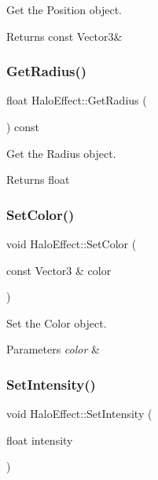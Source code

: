 Get the Position object. 

\begin{DoxyReturn}{Returns}
const Vector3\& 
\end{DoxyReturn}
\mbox{\label{classHaloEffect_a408bdc91b45f3162f05901f46db1bf86}} 
\subsubsection{\texorpdfstring{Get\+Radius()}{GetRadius()}}
{\footnotesize\ttfamily float Halo\+Effect\+::\+Get\+Radius (\begin{DoxyParamCaption}{ }\end{DoxyParamCaption}) const\hspace{0.3cm}{\ttfamily [inline]}}



Get the Radius object. 

\begin{DoxyReturn}{Returns}
float 
\end{DoxyReturn}
\mbox{\label{classHaloEffect_a71a0daca89eeaca58de0ac973b568fa7}} 
\subsubsection{\texorpdfstring{Set\+Color()}{SetColor()}}
{\footnotesize\ttfamily void Halo\+Effect\+::\+Set\+Color (\begin{DoxyParamCaption}\item[{const Vector3 \&}]{color }\end{DoxyParamCaption})}



Set the Color object. 


\begin{DoxyParams}{Parameters}
{\em color} & \\
\hline
\end{DoxyParams}
\mbox{\label{classHaloEffect_a7d8f0434fb0277d93f64b1e9eecacf76}} 
\subsubsection{\texorpdfstring{Set\+Intensity()}{SetIntensity()}}
{\footnotesize\ttfamily void Halo\+Effect\+::\+Set\+Intensity (\begin{DoxyParamCaption}\item[{float}]{intensity }\end{DoxyParamCaption})}



